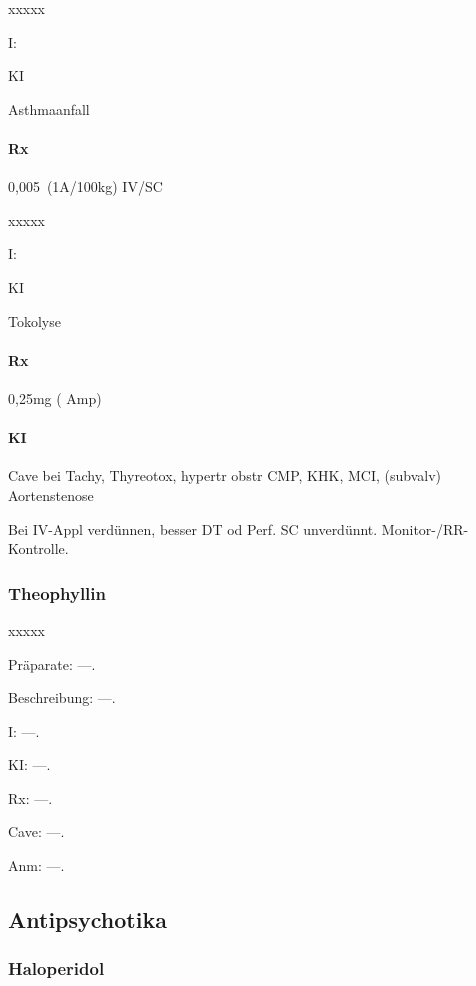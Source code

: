 \begin{labeling}[~]{xxxxx}\item[I:] \item[KI]\end{labeling} Asthmaanfall

\paragraph{Rx} 0,005\, (1A/100kg) IV/SC

\begin{labeling}[~]{xxxxx}\item[I:] \item[KI]\end{labeling} Tokolyse 

\paragraph{Rx} 0,25mg ({\textonehalf} Amp)

\paragraph{KI} Cave bei Tachy, Thyreotox, hypertr obstr CMP, KHK, MCI, (subvalv)
Aortenstenose

Bei IV-Appl verdünnen, besser DT od Perf. SC unverdünnt.
Monitor-/RR-Kontrolle.


\subsubsection{Theophyllin}

\begin{labeling}[~]{xxxxx}
  \item[Präparate:]---.
  \item[Beschreibung:] ---.
  \item[I:] ---.
  \item[KI:] ---.
  \item[Rx:] ---.
  \item[Cave:] ---.
  \item[Anm:] ---.
\end{labeling}



\subsection{Antipsychotika}

\subsubsection{Haloperidol}

